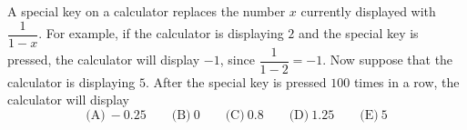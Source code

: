 A special key on a calculator replaces the number $x$ currently displayed with $\dfrac{1}{1-x}$. For example, if the calculator is displaying $2$ and the special key is pressed, the calculator will display $-1$, since $\dfrac{1}{1-2}=-1$. Now suppose that the calculator is displaying $5$. After the special key is pressed $100$ times in a row, the calculator will display
\[
\text{(A)}\ -0.25\qquad\text{(B)}\ 0\qquad\text{(C)}\ 0.8\qquad\text{(D)}\ 1.25\qquad\text{(E)}\ 5
\]
